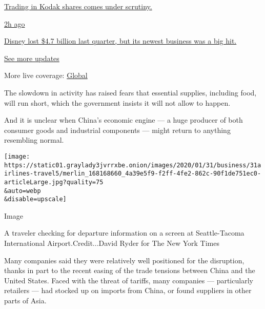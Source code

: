 \href{https://www.nytimes3xbfgragh.onion/live/2020/08/04/business/stock-market-today-coronavirus?action=click\&pgtype=Article\&state=default\&region=MAIN_CONTENT_1\&context=storylines_live_updates\#trading-in-kodak-shares-comes-under-scrutiny}{Trading
in Kodak shares comes under scrutiny.}

\href{https://www.nytimes3xbfgragh.onion/live/2020/08/04/business/stock-market-today-coronavirus?action=click\&pgtype=Article\&state=default\&region=MAIN_CONTENT_1\&context=storylines_live_updates\#disney-lost-4-7-billion-last-quarter-but-its-newest-business-was-a-big-hit}{2h
ago}

\href{https://www.nytimes3xbfgragh.onion/live/2020/08/04/business/stock-market-today-coronavirus?action=click\&pgtype=Article\&state=default\&region=MAIN_CONTENT_1\&context=storylines_live_updates\#disney-lost-4-7-billion-last-quarter-but-its-newest-business-was-a-big-hit}{Disney
lost \$4.7 billion last quarter, but its newest business was a big hit.}

\href{https://www.nytimes3xbfgragh.onion/live/2020/08/04/business/stock-market-today-coronavirus?action=click\&pgtype=Article\&state=default\&region=MAIN_CONTENT_1\&context=storylines_live_updates}{See
more updates}

More live coverage:
\href{https://www.nytimes3xbfgragh.onion/2020/08/04/world/coronavirus-cases.html?action=click\&pgtype=Article\&state=default\&region=MAIN_CONTENT_1\&context=storylines_live_updates}{Global}

The slowdown in activity has raised fears that essential supplies,
including food, will run short, which the government insists it will not
allow to happen.

And it is unclear when China's economic engine --- a huge producer of
both consumer goods and industrial components --- might return to
anything resembling normal.

\texttt{[image: https://static01.graylady3jvrrxbe.onion/images/2020/01/31/business/31airlines-travel5/merlin\_168168660\_4a39e5f9-f2ff-4fe2-862c-90f1de751ec0-articleLarge.jpg?quality=75\\\&auto=webp\\\&disable=upscale]}

Image

A traveler checking for departure information on a screen at
Seattle-Tacoma International Airport.Credit...David Ryder for The New
York Times

Many companies said they were relatively well positioned for the
disruption, thanks in part to the recent easing of the trade tensions
between China and the United States. Faced with the threat of tariffs,
many companies --- particularly retailers --- had stocked up on imports
from China, or found suppliers in other parts of Asia.


